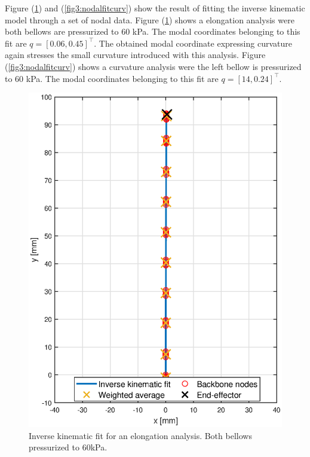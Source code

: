 Figure (\ref{fig3:nodalfitelong}) and (\ref{fig3:nodalfitcurv}) show the result of fitting the inverse kinematic model through a set of nodal data. Figure (\ref{fig3:nodalfitelong}) shows a elongation analysis were both bellows are pressurized to 60 kPa. The modal coordinates belonging to this fit are  $q = [0.06, 0.45]^\top$. The obtained modal coordinate expressing curvature again stresses the small curvature introduced with this analysis. Figure (\ref{fig3:nodalfitcurv}) shows a curvature analysis were the left bellow is pressurized to 60 kPa. The modal coordinates belonging to this fit are $q = [14,0.24]^\top$.


\begin{figure}[H]
    \centering
\begin{minipage}{0.5\textwidth}
        \centering
        \includegraphics[width=\textwidth]{Figures/Chapter3/nodalfitelong.eps}
        \caption{Inverse kinematic fit for an elongation analysis. Both bellows pressurized to 60kPa.}
        \label{fig3:nodalfitelong}

\end{minipage}
\end{figure}
